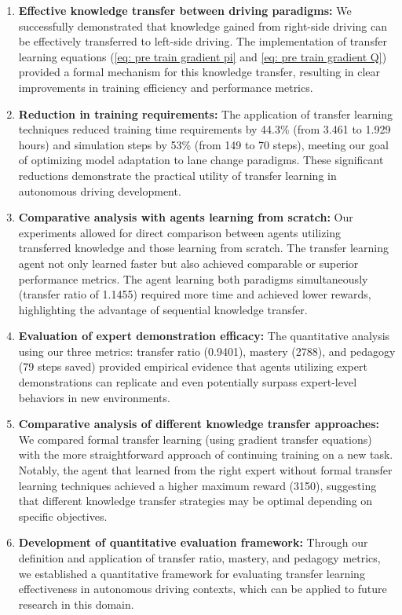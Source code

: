 \begin{enumerate}
    \item \textbf{Effective knowledge transfer between driving paradigms:} We successfully demonstrated that knowledge gained from right-side driving can be effectively transferred to left-side driving. The implementation of transfer learning equations (\ref{eq: pre train gradient pi} and \ref{eq: pre train gradient Q}) provided a formal mechanism for this knowledge transfer, resulting in clear improvements in training efficiency and performance metrics.

    \item \textbf{Reduction in training requirements:} The application of transfer learning techniques reduced training time requirements by 44.3\% (from 3.461 to 1.929 hours) and simulation steps by 53\% (from 149 to 70 steps), meeting our goal of optimizing model adaptation to lane change paradigms. These significant reductions demonstrate the practical utility of transfer learning in autonomous driving development.

    \item \textbf{Comparative analysis with agents learning from scratch:} Our experiments allowed for direct comparison between agents utilizing transferred knowledge and those learning from scratch. The transfer learning agent not only learned faster but also achieved comparable or superior performance metrics. The agent learning both paradigms simultaneously (transfer ratio of 1.1455) required more time and achieved lower rewards, highlighting the advantage of sequential knowledge transfer.

    \item \textbf{Evaluation of expert demonstration efficacy:} The quantitative analysis using our three metrics: transfer ratio (0.9401), mastery (2788), and pedagogy (79 steps saved) provided empirical evidence that agents utilizing expert demonstrations can replicate and even potentially surpass expert-level behaviors in new environments.

    \item \textbf{Comparative analysis of different knowledge transfer approaches:} We compared formal transfer learning (using gradient transfer equations) with the more straightforward approach of continuing training on a new task. Notably, the agent that learned from the right expert without formal transfer learning techniques achieved a higher maximum reward (3150), suggesting that different knowledge transfer strategies may be optimal depending on specific objectives.

    \item \textbf{Development of quantitative evaluation framework:} Through our definition and application of transfer ratio, mastery, and pedagogy metrics, we established a quantitative framework for evaluating transfer learning effectiveness in autonomous driving contexts, which can be applied to future research in this domain.
\end{enumerate}

